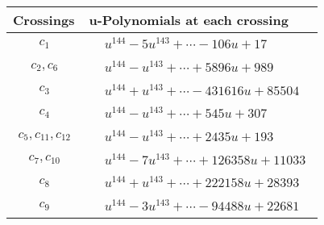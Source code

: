 \documentclass[1p]{elsarticle_modified}
\theoremstyle{definition}
\begin{document}
\begin{tabular}{m{50pt}|m{274pt}}
Crossings & \hspace{64pt}u-Polynomials at each crossing \\
\hline $$\begin{aligned}c_{1}\end{aligned}$$&$\begin{aligned}
&u^{144}-5 u^{143}+\cdots-106 u+17
\end{aligned}$\\
\hline $$\begin{aligned}c_{2},c_{6}\end{aligned}$$&$\begin{aligned}
&u^{144}- u^{143}+\cdots+5896 u+989
\end{aligned}$\\
\hline $$\begin{aligned}c_{3}\end{aligned}$$&$\begin{aligned}
&u^{144}+u^{143}+\cdots-431616 u+85504
\end{aligned}$\\
\hline $$\begin{aligned}c_{4}\end{aligned}$$&$\begin{aligned}
&u^{144}- u^{143}+\cdots+545 u+307
\end{aligned}$\\
\hline $$\begin{aligned}c_{5},c_{11},c_{12}\end{aligned}$$&$\begin{aligned}
&u^{144}- u^{143}+\cdots+2435 u+193
\end{aligned}$\\
\hline $$\begin{aligned}c_{7},c_{10}\end{aligned}$$&$\begin{aligned}
&u^{144}-7 u^{143}+\cdots+126358 u+11033
\end{aligned}$\\
\hline $$\begin{aligned}c_{8}\end{aligned}$$&$\begin{aligned}
&u^{144}+u^{143}+\cdots+222158 u+28393
\end{aligned}$\\
\hline $$\begin{aligned}c_{9}\end{aligned}$$&$\begin{aligned}
&u^{144}-3 u^{143}+\cdots-94488 u+22681
\end{aligned}$\\
\hline
\end{tabular}\\~\\
\end{document}
